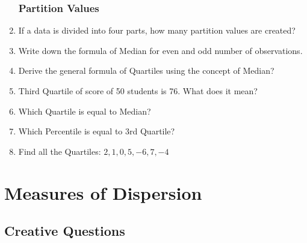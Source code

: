 \documentclass[a4paper,oneside]{book}
\begin{document}
\begin{enumerate}
\subsection{Partition Values}
    \item If a data is divided into four parts, how many partition values are created?
    \item Write down the formula of Median for even and odd number of observations.
    \item Derive the general formula of Quartiles using the concept of Median?
    \item Third Quartile of score of 50 students is 76. What does it mean?
    \item Which Quartile is equal to Median?
    \item Which Percentile is equal to 3rd Quartile?
    \item Find all the Quartiles: $2,1,0,5,-6,7,-4$

    
\end{enumerate}

\chapter{Measures of Dispersion} 
\section{Creative Questions}
\end{document}
